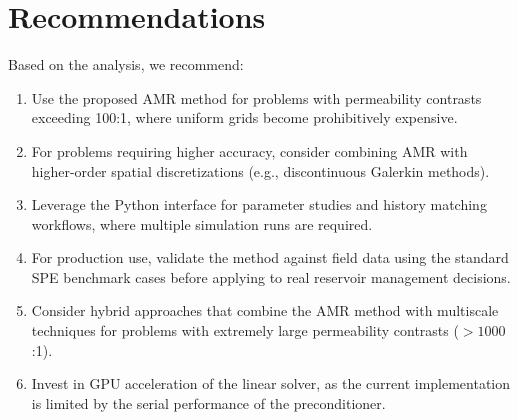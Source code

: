 \section{Recommendations}
\label{sec:discussion:recommendations}

Based on the analysis, we recommend:

\begin{enumerate}
    \item Use the proposed AMR method for problems with permeability contrasts exceeding 100:1, where uniform grids become prohibitively expensive.

    \item For problems requiring higher accuracy, consider combining AMR with higher-order spatial discretizations (e.g., discontinuous Galerkin methods).

    \item Leverage the Python interface for parameter studies and history matching workflows, where multiple simulation runs are required.

    \item For production use, validate the method against field data using the standard SPE benchmark cases before applying to real reservoir management decisions.

    \item Consider hybrid approaches that combine the AMR method with multiscale techniques for problems with extremely large permeability contrasts ($> 1000$:1).

    \item Invest in GPU acceleration of the linear solver, as the current implementation is limited by the serial performance of the preconditioner.
\end{enumerate}
